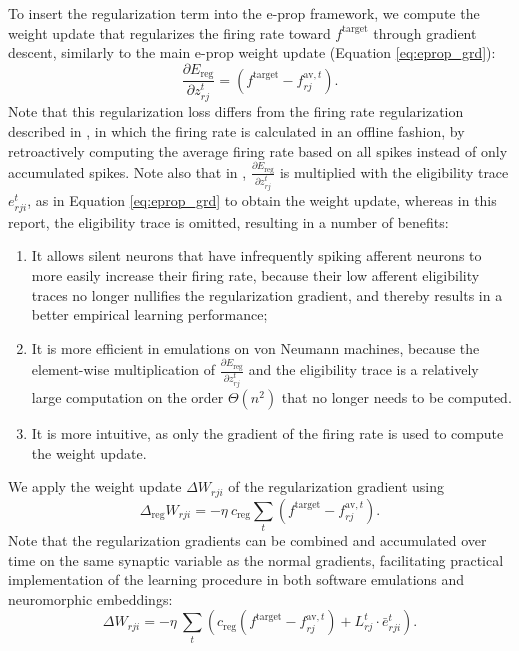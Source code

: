 		To insert the regularization term into the e-prop framework, we compute the weight update that regularizes the firing rate toward $f^\text{target}$ through gradient descent, similarly to the main e-prop weight update (Equation \ref{eq:eprop_grd}):
		\begin{equation}
		\frac{\partial E_\text{reg}}{\partial z_{rj}^t} = \left(f^\text{target} - f^{\text{av}, t}_{rj}\right).
		\end{equation}
		Note that this regularization loss differs from the firing rate regularization described in \citet{bellec2020solution}, in which the firing rate is calculated in an offline fashion, by retroactively computing the average firing rate based on all spikes instead of only accumulated spikes.
		Note also that in \citet{bellec2020solution}, $\frac{\partial E_\text{reg}}{\partial z_{rj}^t}$ is multiplied with the eligibility trace $e^t_{rji}$, as in Equation \ref{eq:eprop_grd} to obtain the weight update, whereas in this report, the eligibility trace is omitted, resulting in a number of benefits:
		\begin{enumerate}
			\item It allows silent neurons that have infrequently spiking afferent neurons to more easily increase their firing rate, because their low afferent eligibility traces no longer nullifies the regularization gradient, and thereby results in a better empirical learning performance;
			\item It is more efficient in emulations on von Neumann machines, because the element-wise multiplication of $\frac{\partial E_\text{reg}}{\partial z_{rj}^t}$ and the eligibility trace is a relatively large computation on the order $\Theta\!\left(n^2\right)$ that no longer needs to be computed.
			\item It is more intuitive, as only the gradient of the firing rate is used to compute the weight update.
		\end{enumerate}
		We apply the weight update $\Delta W_{rji}$ of the regularization gradient using
		\begin{equation}
		\Delta_\text{reg} W_{rji} = -\eta\ c_\text{reg}\sum_t\left(f^\text{target} - f^{\text{av}, t}_{rj}\right).
		\end{equation}
		Note that the regularization gradients can be combined and accumulated over time on the same synaptic variable as the normal gradients, facilitating practical implementation of the learning procedure in both software emulations and neuromorphic embeddings:
		\begin{equation}
		\Delta W_{rji} = -\eta\ \sum_t\left(c_\text{reg}\left(f^\text{target} - f^{\text{av}, t}_{rj}\right) + L^t_{rj}\cdot\bar{e}^t_{rji}\right).
		\end{equation}


